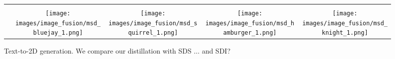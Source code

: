 \begin{figure}[h]
\begin{tabular}{ccccc}
\begin{minipage}{.24\linewidth}
        \end{minipage} 
        \\ \addlinespace[2pt]
        \parbox[t]{3mm}{} & 
        \begin{minipage}{.24\linewidth}
        \texttt{[image: images/image\_fusion/msd\_bluejay\_1.png]}
        \end{minipage}
        &
        \begin{minipage}{.24\linewidth}
        \texttt{[image: images/image\_fusion/msd\_squirrel\_1.png]}
        \end{minipage} 
        &
        \begin{minipage}{.24\linewidth}
        \texttt{[image: images/image\_fusion/msd\_hamburger\_1.png]}
        \end{minipage} 
        &
        \begin{minipage}{.24\linewidth}
        \texttt{[image: images/image\_fusion/msd\_knight\_1.png]}
        \end{minipage} 
    \end{tabular}
\vspace{-2mm}
    \caption{Text-to-2D generation. We compare our distillation with SDS $\hdots$ and SDI?  
    }
    \label{fig:textto2d}
\vspace{-3mm}
\end{figure}
